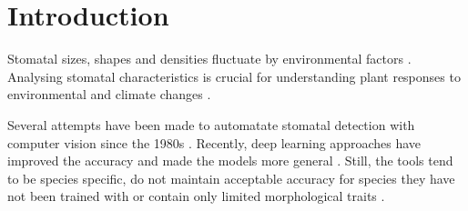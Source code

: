 \documentclass[a4paper,12pt,bibliography=totoc,numbers=noenddot,sfdefaults=false,abstract=true,notitlepage]{scrartcl} %
\begin{document}
	
	
	\begin{singlespace}
	\maketitle %
		
				
				
		
	\end{singlespace}


	
	
	\section{Introduction}\label{intro}
	
Stomatal sizes, shapes and densities fluctuate by environmental factors \autocite{hetheringtonRoleStomataSensing2003, cassonInfluenceEnvironmentalFactors2008, bertolinoImpactStomatalDensity2019}. Analysing stomatal characteristics is crucial for understanding plant responses to environmental and climate changes \autocite{hetheringtonRoleStomataSensing2003, yanContrastingResponsesLeaf2017, liangStomatalResponsesTerrestrial2023}.

Several attempts have been made to automatate stomatal detection with computer vision since the 1980s \autocite{omasaMeasurementStomatalAperture1984,karabourniotisEpicuticularPhenolicsGuard2001,lagaImagebasedPlantStornata2014,duarteSegmentingHighqualityDigital2017}. Recently, deep learning approaches have improved the accuracy and made the models more general \autocite{fetterStomataCounterNeuralNetwork2019,saiStomaAIEfficientUserfriendly2023,gibbsDeepLearningMethod2021}. Still, the tools tend to be species specific, do not maintain acceptable accuracy for species they have not been trained with or contain only limited morphological traits \autocite{gibbsApplicationDeepLearning2024}. 
\end{document}
